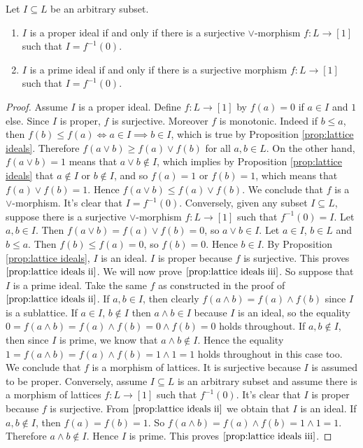 \begin{proposition} \label{prop:lattice homset bijections}
Let $I \subseteq L$ be an arbitrary subset.
\begin{enumerate}[label=\romansmallnumbering]
  \item \label{prop:lattice ideals ii}
  $I$ is a proper ideal if and only if there is a surjective $\vee$-morphism $f : L \to [1]$ such that $I = f^{-1}(0)$.
  \item \label{prop:lattice ideals iii}
  $I$ is a prime ideal if and only if there is a surjective morphism $f : L \to [1]$ such that $I = f^{-1}(0)$.
\end{enumerate}
\end{proposition}
\begin{proof}
Assume $I$ is a proper ideal. 
Define $f : L \to [1]$ by $f(a) = 0$ if $a \in I$ and $1$ else. 
Since $I$ is proper, $f$ is surjective. 
Moreover $f$ is monotonic. 
Indeed if $b \leq a$, then $f(b) \leq f(a) \iff a \in I \implies b \in I$, which is true by Proposition \ref{prop:lattice ideals}. 
Therefore $f(a \vee b) \geq f(a) \vee f(b)$ for all $a,b \in L$. 
On the other hand, $f(a \vee b) = 1$ means that $a \vee b \not\in I$, which implies by Proposition \ref{prop:lattice ideals} that $a \not\in I$ or $b \not\in I$, and so $f(a) = 1$ or $f(b) = 1$, which means that $f(a) \vee f(b) = 1$. 
Hence $f(a \vee b) \leq f(a) \vee f(b)$. 
We conclude that $f$ is a $\vee$-morphism. 
It's clear that $I = f^{-1}(0)$. 
Conversely, given any subset $I \subseteq L$, suppose there is a surjective $\vee$-morphism $f : L \to [1]$ such that $f^{-1}(0) = I$. 
Let $a,b \in I$. Then $f(a \vee b) = f(a) \vee f(b) = 0$, so $a \vee b \in I$. 
Let $a \in I$, $b \in L$ and $b \leq a$. 
Then $f(b) \leq f(a) = 0$, so $f(b) = 0$. 
Hence $b \in I$. By Proposition \ref{prop:lattice ideals}, $I$ is an ideal. 
$I$ is proper because $f$ is surjective. 
This proves $\ref{prop:lattice ideals ii}$. 
We will now prove $\ref{prop:lattice ideals iii}$. 
So suppose that $I$ is a prime ideal. 
Take the same $f$ as constructed in the proof of $\ref{prop:lattice ideals ii}$. 
If $a,b \in I$, then clearly $f(a \wedge b) = f(a) \wedge f(b)$ since $I$ is a sublattice. 
If $a \in I$, $b \not\in I$ then $a \wedge b \in I$ because $I$ is an ideal, so the equality $0 = f(a \wedge b) = f(a) \wedge f(b) = 0 \wedge f(b) = 0$ holds throughout. 
If $a,b \not\in I$, then since $I$ is prime, we know that $a \wedge b \not\in I$. 
Hence the equality $1 = f(a \wedge b) = f(a) \wedge f(b) = 1 \wedge 1 = 1$ holds throughout in this case too. 
We conclude that $f$ is a morphism of lattices. 
It is surjective because $I$ is assumed to be proper. 
Conversely, assume $I \subseteq L$ is an arbitrary subset and assume there is a morphism of lattices $f : L \to [1]$ such that $f^{-1}(0)$. 
It's clear that $I$ is proper because $f$ is surjective. 
From $\ref{prop:lattice ideals ii}$ we obtain that $I$ is an ideal. 
If $a,b \not\in I$, then $f(a) = f(b) = 1$. 
So $f(a \wedge b) = f(a) \wedge f(b) = 1 \wedge 1 = 1$. 
Therefore $a \wedge b \not\in I$. 
Hence $I$ is prime. 
This proves $\ref{prop:lattice ideals iii}$.
\end{proof}

